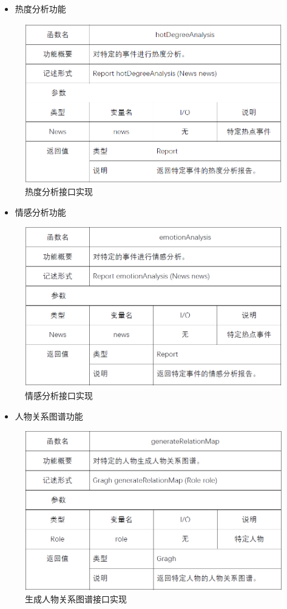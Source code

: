 \begin{itemize}
	\item 热度分析功能
\end{itemize}
\begin{figure}[!htbp]
	\centering
	\includegraphics[scale=0.7]{image/b24.png} %
	\caption{热度分析接口实现} %
\end{figure}
\begin{itemize}
	\item 情感分析功能
\end{itemize}
\begin{figure}[!htbp]
	\centering
	\includegraphics[scale=0.7]{image/b25.png} %
	\caption{情感分析接口实现} %
\end{figure}
\begin{itemize}
	\item 人物关系图谱功能
\end{itemize}
\begin{figure}[!htbp]
	\centering
	\includegraphics[scale=0.7]{image/b26.png} %
	\caption{生成人物关系图谱接口实现} %
\end{figure}
